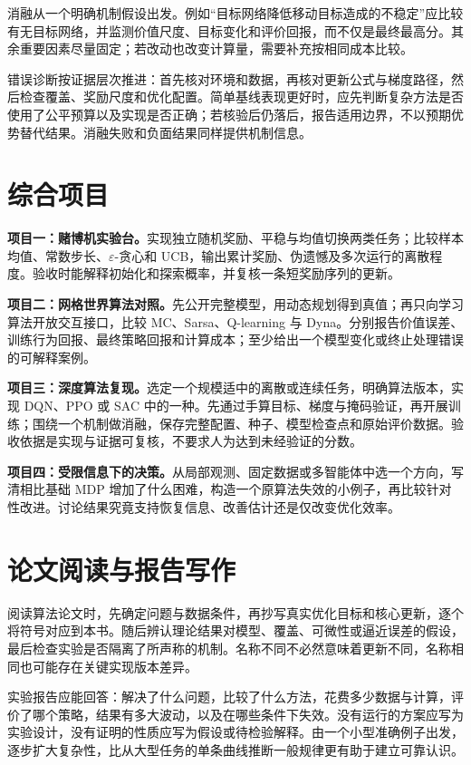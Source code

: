\documentclass[UTF8,12pt,a4paper,fontset=fandol]{ctexbook}
\begin{document}
消融从一个明确机制假设出发。例如“目标网络降低移动目标造成的不稳定”应比较有无目标网络，并监测价值尺度、目标变化和评价回报，而不仅是最终最高分。其余重要因素尽量固定；若改动也改变计算量，需要补充按相同成本比较。

错误诊断按证据层次推进：首先核对环境和数据，再核对更新公式与梯度路径，然后检查覆盖、奖励尺度和优化配置。简单基线表现更好时，应先判断复杂方法是否使用了公平预算以及实现是否正确；若核验后仍落后，报告适用边界，不以预期优势替代结果。消融失败和负面结果同样提供机制信息。

\section{综合项目}

\textbf{项目一：赌博机实验台。}实现独立随机奖励、平稳与均值切换两类任务；比较样本均值、常数步长、$\varepsilon$-贪心和 UCB，输出累计奖励、伪遗憾及多次运行的离散程度。验收时能解释初始化和探索概率，并复核一条短奖励序列的更新。

\textbf{项目二：网格世界算法对照。}先公开完整模型，用动态规划得到真值；再只向学习算法开放交互接口，比较 MC、Sarsa、Q-learning 与 Dyna。分别报告价值误差、训练行为回报、最终策略回报和计算成本；至少给出一个模型变化或终止处理错误的可解释案例。

\textbf{项目三：深度算法复现。}选定一个规模适中的离散或连续任务，明确算法版本，实现 DQN、PPO 或 SAC 中的一种。先通过手算目标、梯度与掩码验证，再开展训练；围绕一个机制做消融，保存完整配置、种子、模型检查点和原始评价数据。验收依据是实现与证据可复核，不要求人为达到未经验证的分数。

\textbf{项目四：受限信息下的决策。}从局部观测、固定数据或多智能体中选一个方向，写清相比基础 MDP 增加了什么困难，构造一个原算法失效的小例子，再比较针对性改进。讨论结果究竟支持恢复信息、改善估计还是仅改变优化效率。

\section{论文阅读与报告写作}

阅读算法论文时，先确定问题与数据条件，再抄写真实优化目标和核心更新，逐个将符号对应到本书。随后辨认理论结果对模型、覆盖、可微性或逼近误差的假设，最后检查实验是否隔离了所声称的机制。名称不同不必然意味着更新不同，名称相同也可能存在关键实现版本差异。

实验报告应能回答：解决了什么问题，比较了什么方法，花费多少数据与计算，评价了哪个策略，结果有多大波动，以及在哪些条件下失效。没有运行的方案应写为实验设计，没有证明的性质应写为假设或待检验解释。由一个小型准确例子出发，逐步扩大复杂性，比从大型任务的单条曲线推断一般规律更有助于建立可靠认识。
\end{document}
